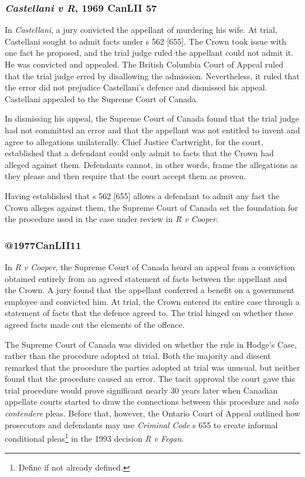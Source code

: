 \subsubsection{\textit{Castellani v R}, 1969 CanLII 57}

In \textit{Castellani}, a jury convicted the appellant of murdering his wife. At trial, Castellani sought to admit facts under s 562 [655]. The Crown took issue with one fact he proposed, and the trial judge ruled the appellant could not admit it. He was convicted and appealed. The British Columbia Court of Appeal ruled that the trial judge erred by disallowing the admission. Nevertheless, it ruled that the error did not prejudice Castellani's defence and dismissed his appeal. Castellani appealed to the Supreme Court of Canada.

In dismissing his appeal, the Supreme Court of Canada found that the trial judge had not committed an error and that the appellant was not entitled to invent and agree to allegations unilaterally. Chief Justice Cartwright, for the court, established that a defendant could only admit to facts that the Crown had alleged against them. Defendants cannot, in other words, frame the allegations as they please and then require that the court accept them as proven.

Having established that s 562 [655] allows a defendant to admit any fact the Crown alleges against them, the Supreme Court of Canada set the foundation for the procedure used in the case under review in \textit{R v Cooper}.

\subsubsection{@1977CanLII11}

In \textit{R v Cooper}, the Supreme Court of Canada heard an appeal from a conviction obtained entirely from an agreed statement of facts between the appellant and the Crown. A jury found that the appellant conferred a benefit on a government employee and convicted him. At trial, the Crown entered its entire case through a statement of facts that the defence agreed to. The trial hinged on whether these agreed facts made out the elements of the offence.

The Supreme Court of Canada was divided on whether the rule in Hodge's Case, rather than the procedure adopted at trial. Both the majority and dissent remarked that the procedure the parties adopted at trial was unusual, but neither found that the procedure caused an error. The tacit approval the court gave this trial procedure would prove significant nearly 30 years later when Canadian appellate courts started to draw the connections between this procedure and \textit{nolo contendere} pleas. Before that, however, the Ontario Court of Appeal outlined how prosecutors and defendants may use \textit{Criminal Code} s 655 to create informal conditional pleas\footnote{Define if not already defined.} in the 1993 decision \textit{R v Fegan}.

